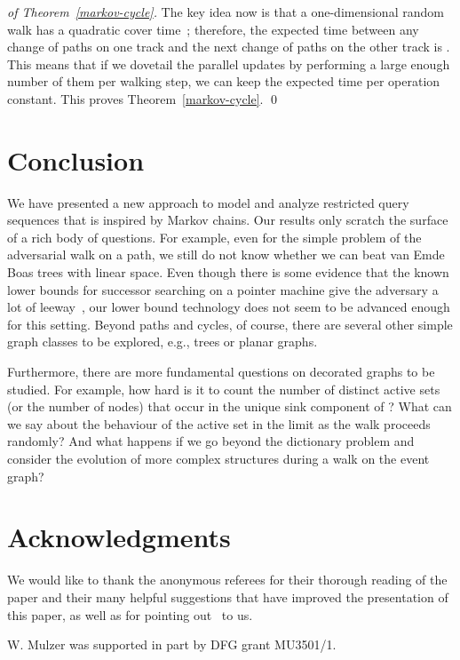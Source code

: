 \documentclass[oribibl,envcountsect,envcountsame]{llncs}
\begin{document}
\begin{proof}[of Theorem~\ref{markov-cycle}]
The key idea now is that a one-dimensional random walk has 
a quadratic cover time~\cite{MotwaniRa95};
therefore, the expected
time between any change of paths on one track and
the next change of paths on the other track is .
This means that if we dovetail the parallel updates by
performing a large enough number of them per walking step,
we can keep the expected time per operation constant.
This proves Theorem~\ref{markov-cycle}.
\qed\end{proof}

\section{Conclusion}

We have presented a new approach to model and analyze restricted
query sequences that is inspired by Markov chains. 
Our results only scratch the surface of a rich body of questions.
For example, even for the simple problem of the adversarial walk
on a path, we still do not know whether we can beat van Emde
Boas trees with linear space. Even though there is some 
evidence that the known lower bounds for successor searching
on a pointer machine
give the adversary a lot of leeway~\cite{Mulzer09}, our
lower bound technology
does not seem to be advanced enough for this setting.
Beyond paths and cycles, of course, there are several other
simple graph classes to be explored, e.g., trees or planar
graphs.

Furthermore, there are more fundamental questions on decorated
graphs to be studied. For example, how hard is it to count
the number of distinct active sets (or the number of nodes) 
that occur in the unique sink component of ? 
What can we say about the  behaviour of the active
set in the limit as the walk proceeds randomly? And what happens
if we go beyond the dictionary problem and consider the evolution
of more complex structures during a walk on the event graph?

\section*{Acknowledgments}
We would like to thank the anonymous referees for their thorough
reading of the paper and their many helpful suggestions that have
improved the presentation of this paper, as well
as for pointing out~\cite{CrochemoreIlKuRaWa12} to us.

W. Mulzer was supported in part by DFG grant MU3501/1.



\end{document}
